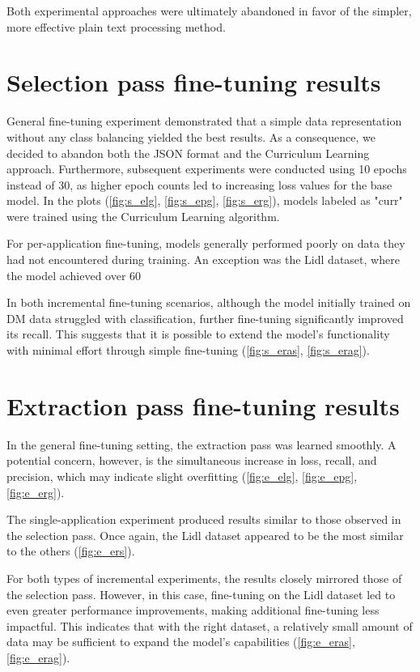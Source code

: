 \documentclass[licencjacka,en]{pracamgr}
\begin{document}
Both experimental approaches were ultimately abandoned in favor of the simpler, more effective plain text processing method.

\section{Selection pass fine-tuning results}
General fine-tuning experiment demonstrated that a simple data representation without any class balancing yielded the best results. As a consequence, we decided to abandon both the JSON format and the Curriculum Learning approach. Furthermore, subsequent experiments were conducted using 10 epochs instead of 30, as higher epoch counts led to increasing loss values for the base model. In the plots (\ref{fig:s_elg}, \ref{fig:s_epg}, \ref{fig:s_erg}), models labeled as "curr" were trained using the Curriculum Learning algorithm.

For per-application fine-tuning, models generally performed poorly on data they had not encountered during training. An exception was the Lidl dataset, where the model achieved over 60%

In both incremental fine-tuning scenarios, although the model initially trained on DM data struggled with classification, further fine-tuning significantly improved its recall. This suggests that it is possible to extend the model's functionality with minimal effort through simple fine-tuning (\ref{fig:s_eras}, \ref{fig:s_erag}).

\section{Extraction pass fine-tuning results}
In the general fine-tuning setting, the extraction pass was learned smoothly. A potential concern, however, is the simultaneous increase in loss, recall, and precision, which may indicate slight overfitting (\ref{fig:e_elg}, \ref{fig:e_epg}, \ref{fig:e_erg}).

The single-application experiment produced results similar to those observed in the selection pass. Once again, the Lidl dataset appeared to be the most similar to the others (\ref{fig:e_ers}).

For both types of incremental experiments, the results closely mirrored those of the selection pass. However, in this case, fine-tuning on the Lidl dataset led to even greater performance improvements, making additional fine-tuning less impactful. This indicates that with the right dataset, a relatively small amount of data may be sufficient to expand the model’s capabilities (\ref{fig:e_eras}, \ref{fig:e_erag}).
\end{document}
